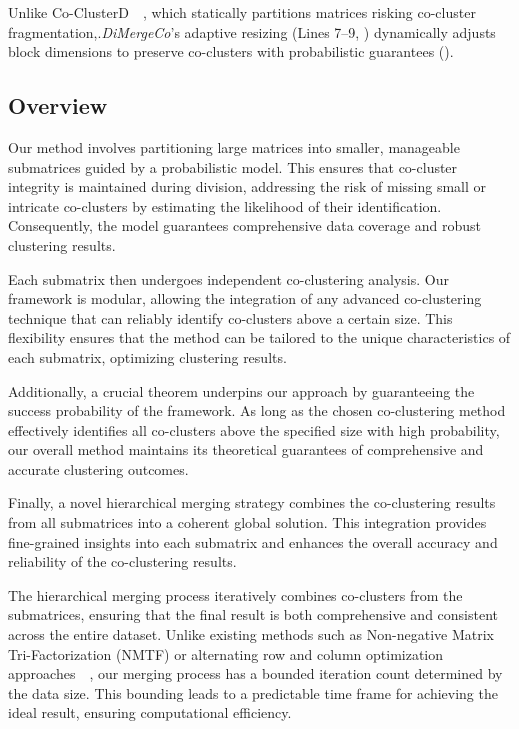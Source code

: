 \documentclass[journal]{IEEEtran}
\renewcommand{\cite}[1]{~\autocite{#1}}
\begin{document}
Unlike Co-ClusterD~\cite{cheng2015CoClusterDDistributedFramework}, which statically partitions matrices risking co-cluster fragmentation,.\emph{DiMergeCo}'s adaptive resizing (Lines 7--9, ) dynamically adjusts block dimensions to preserve co-clusters with probabilistic guarantees ().

\subsection{Overview}
\label{subsec:overview}
Our method involves partitioning large matrices into smaller, manageable submatrices guided by a probabilistic model. This ensures that co-cluster integrity is maintained during division, addressing the risk of missing small or intricate co-clusters by estimating the likelihood of their identification. Consequently, the model guarantees comprehensive data coverage and robust clustering results.

Each submatrix then undergoes independent co-clustering analysis. Our framework is modular, allowing the integration of any advanced co-clustering technique that can reliably identify co-clusters above a certain size. This flexibility ensures that the method can be tailored to the unique characteristics of each submatrix, optimizing clustering results.

Additionally, a crucial theorem underpins our approach by guaranteeing the success probability of the framework. As long as the chosen co-clustering method effectively identifies all co-clusters above the specified size with high probability, our overall method maintains its theoretical guarantees of comprehensive and accurate clustering outcomes.

Finally, a novel hierarchical merging strategy combines the co-clustering results from all submatrices into a coherent global solution. This integration provides fine-grained insights into each submatrix and enhances the overall accuracy and reliability of the co-clustering results.

The hierarchical merging process iteratively combines co-clusters from the submatrices, ensuring that the final result is both comprehensive and consistent across the entire dataset. Unlike existing methods such as Non-negative Matrix Tri-Factorization (NMTF) or alternating row and column optimization approaches~\cite{wang2011FastNonnegativeMatrix}, our merging process has a bounded iteration count determined by the data size. This bounding leads to a predictable time frame for achieving the ideal result, ensuring computational efficiency.
\end{document}
